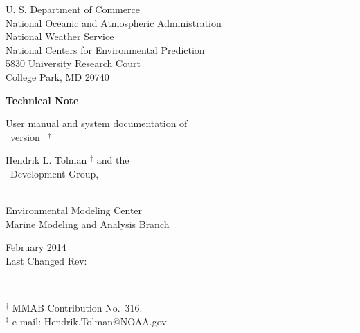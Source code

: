 
\pagestyle{empty}

\begin{center} 
U. S. Department of Commerce \\
National Oceanic and Atmospheric Administration \\
National Weather Service \\
National Centers for Environmental Prediction \\
5830 University Research Court \\
College Park, MD 20740


\vspace{15mm}

{\bf Technical Note}

\vspace{15mm}

{\large User manual and system documentation of \\
\ww\ version \WWver\ $^\dag$} \\

\vspace{15mm}

Hendrik L. Tolman $^\ddag$ and the \\
\ww\ Development Group, \\
\strut \\
Environmental Modeling Center \\
Marine Modeling and Analysis Branch

\vfill

February 2014 \\
Last Changed Rev: \SVNRevision\ %
\vspace{\baselineskip}


\vfill

\end{center}
\noindent \rule{140mm}{0.5mm} \\
{\small $^\dag$ MMAB Contribution No.~316. \\
$^\ddag$ e-mail: Hendrik.Tolman@NOAA.gov}

